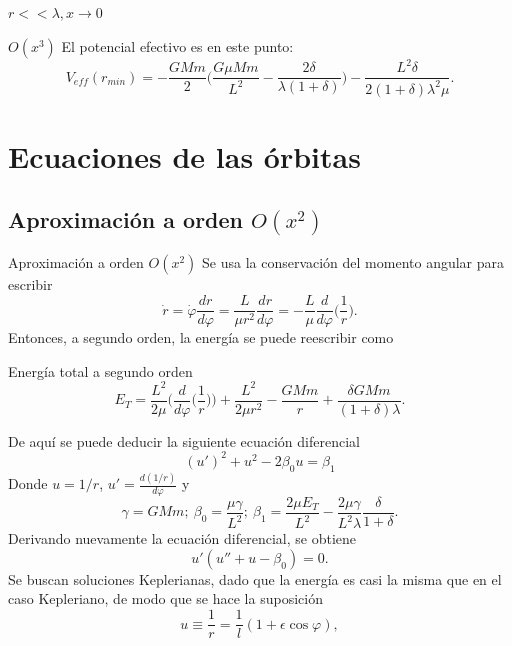\documentclass{beamer}
\begin{document}
\begin{frame}[allowframebreaks]{$r<<\lambda, x\rightarrow 0$}
\begin{block}{$O(x^3)$}
	El potencial efectivo es en este punto:
	\begin{equation}
		V_{eff}(r_{min})=-\frac{GMm}{2}\Bigg(\frac{G\mu Mm}{L^2}-\frac{2\delta}{\lambda(1+\delta)}\Bigg)-\frac{L^2\delta}{2(1+\delta)\lambda^2\mu}.
	\end{equation}
	\end{block}
	\end{frame}
	
	\section{Ecuaciones de las órbitas}
	\subsection{Aproximación a orden $O(x^2)$}
	\begin{frame}[allowframebreaks]{Aproximación a orden $O(x^2)$}
		Se usa la conservación del momento angular para escribir
		\begin{equation}
			\dot{r}=\dot{\varphi}\frac{dr}{d\varphi}=\frac{L}{\mu r^2}\frac{dr}{d\varphi}=-\frac{L}{\mu}\frac{d}{d\varphi}\Big(\frac{1}{r} \Big).
	\end{equation}
	Entonces, a segundo orden, la energía se puede reescribir como
	\begin{block}{Energía total a segundo orden}
	\begin{equation}
		E_T=\frac{L^2}{2\mu}\Big( \frac{d}{d\varphi}\Big(\frac{1}{r}\Big) \Big)+\frac{L^2}{2\mu r^2}-\frac{GMm}{r}+\frac{\delta GMm}{(1+\delta)\lambda}.
	\end{equation}
	\end{block}
	De aquí se puede deducir la siguiente ecuación diferencial
	\begin{equation}
		(u')^2+u^2-2\beta_0 u=\beta_1
	\end{equation}
	Donde $u=1/r$, $u'=\frac{d(1/r)}{d\varphi}$ y
	\begin{equation}
	\gamma=GMm; \ \beta_0=\frac{\mu\gamma}{L^2}; \ \beta_1=\frac{2\mu E_T}{L^2}-\frac{2\mu\gamma}{L^2\lambda}\frac{\delta}{1+\delta}.
	\end{equation}
	Derivando nuevamente la ecuación diferencial, se obtiene
	\begin{equation}
		u'(u''+u-\beta_0)=0.
	\end{equation}
	Se buscan soluciones Keplerianas, dado que la energía es casi la misma que en el caso Kepleriano, de modo que se hace la suposición
	$$u\equiv \frac{1}{r}=\frac{1}{l}(1+\epsilon\cos\varphi),$$

\end{frame}
\end{document}
